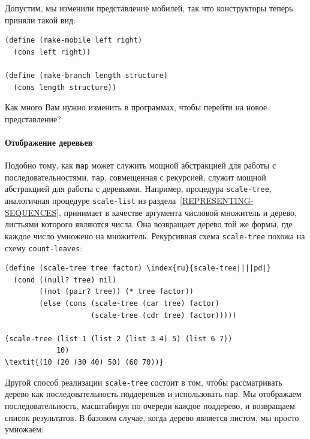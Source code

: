 \begin{exercise}{2.29}
\begin{plainenum}
\item
Допустим, мы изменили представление мобилей, так
  что конструкторы теперь приняли такой вид:

\begin{Verbatim}[fontsize=\small]
(define (make-mobile left right)
  (cons left right))

(define (make-branch length structure)
  (cons length structure))
\end{Verbatim}

Как много Вам нужно изменить в программах, чтобы перейти на новое представление?
\end{plainenum}
\end{exercise}

\paragraph{Отображение деревьев}


%
Подобно тому, как {\tt map} может служить  мощной
абстракцией для работы с последовательностями, {\tt map},
совмещенная с рекурсией, служит мощной абстракцией для работы с
деревьями.  Например, процедура {\tt scale-tree}, аналогичная
процедуре {\tt scale-list} из раздела~\ref{REPRESENTING-SEQUENCES}, принимает в качестве
аргумента числовой множитель и дерево, листьями которого являются
числа.  Она возвращает дерево той же формы, где каждое число умножено 
на множитель.  Рекурсивная схема {\tt scale-tree} похожа на
схему {\tt count-leaves}:


\begin{Verbatim}[fontsize=\small]
(define (scale-tree tree factor) \index{ru}{scale-tree||||pd|}
  (cond ((null? tree) nil)
        ((not (pair? tree)) (* tree factor))
        (else (cons (scale-tree (car tree) factor)
                    (scale-tree (cdr tree) factor)))))

(scale-tree (list 1 (list 2 (list 3 4) 5) (list 6 7))
            10)
\textit{(10 (20 (30 40) 50) (60 70))}
\end{Verbatim}

Другой способ реализации {\tt scale-tree} состоит в том, чтобы  рассматривать дерево как последовательность поддеревьев и 
использовать {\tt map}.  Мы отображаем последовательность,
масштабируя по очереди каждое поддерево, и возвращаем список
результатов.  В базовом случае, когда дерево является листом, мы
просто умножаем:


